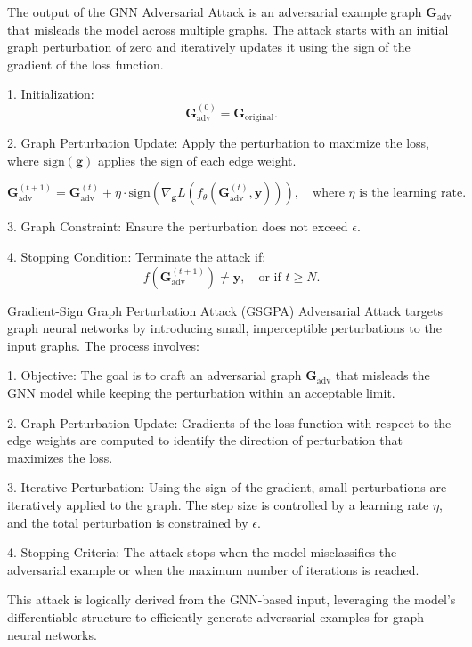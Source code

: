 

The output of the GNN Adversarial Attack is an adversarial example graph $\mathbf{G}_{\text{adv}}$ that misleads the model across multiple graphs. The attack starts with an initial graph perturbation of zero and iteratively updates it using the sign of the gradient of the loss function.

1. Initialization:
   \[
   \mathbf{G}_{\text{adv}}^{(0)} = \mathbf{G}_{\text{original}}.
   \]

2. Graph Perturbation Update:
   Apply the perturbation to maximize the loss, where $\text{sign}(\mathbf{g})$ applies the sign of each edge weight.

   \[
   \mathbf{G}_{\text{adv}}^{(t+1)} = \mathbf{G}_{\text{adv}}^{(t)} + \eta \cdot \text{sign}(\nabla_\mathbf{g} L(f_\theta(\mathbf{G}_{\text{adv}}^{(t)}, \mathbf{y}))), \quad \text{where } \eta \text{ is the learning rate.}
   \]

3. Graph Constraint:
   Ensure the perturbation does not exceed $\epsilon$.

4. Stopping Condition:
   Terminate the attack if:
   \[
   f(\mathbf{G}_{\text{adv}}^{(t+1)}) \neq \mathbf{y}, \quad \text{or if } t \geq N.
   \]

Gradient-Sign Graph Perturbation Attack (GSGPA) Adversarial Attack targets graph neural networks by introducing small, imperceptible perturbations to the input graphs. The process involves:

1. Objective: The goal is to craft an adversarial graph $\mathbf{G}_{\text{adv}}$ that misleads the GNN model while keeping the perturbation within an acceptable limit.

2. Graph Perturbation Update: Gradients of the loss function with respect to the edge weights are computed to identify the direction of perturbation that maximizes the loss.

3. Iterative Perturbation: Using the sign of the gradient, small perturbations are iteratively applied to the graph. The step size is controlled by a learning rate $\eta$, and the total perturbation is constrained by $\epsilon$.

4. Stopping Criteria: The attack stops when the model misclassifies the adversarial example or when the maximum number of iterations is reached.

This attack is logically derived from the GNN-based input, leveraging the model's differentiable structure to efficiently generate adversarial examples for graph neural networks.